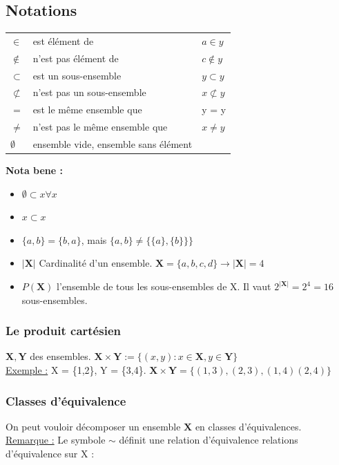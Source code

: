 \documentclass[12pt,a4paper]{article}
\begin{document}
\subsection{Notations}
\begin{center}
\begin{tabular}{lll}
$\in $&  est élément de & $a \in y$\\
$\not \in $& n'est pas élément de &$ c \notin y$\\
$\subset $ &  est un sous-ensemble & $y \subset y$\\
$\not \subset$ & n'est pas un sous-ensemble & $x \not\subset y$\\
$=$ & est le même ensemble que & y = y\\
$\neq$ &  n'est pas le même ensemble que & $x \neq y$\\
$\emptyset$ & ensemble vide, ensemble sans élément\\
\end{tabular}
\end{center}
\textbf{Nota bene :}
\begin{itemize}[label=\textbullet,itemsep=-10pt]
\item $\emptyset \subset x \forall x$
\item $x \subset x$
\item $\{a,b\} = \{b,a\}$, mais $\{a,b\} \neq \{\{a\},\{b\}\}\}$
\item $| \mathbf{X}|$ Cardinalité d'un ensemble. $\mathbf{X} = \{a, b, c, d\} \to |\mathbf{X}| = 4$
\item $P(\mathbf{X})$ l'ensemble de tous les sous-ensembles de X. Il vaut $2^{|\mathbf{X}|} = 2^4 = 16$ sous-ensembles.
\end{itemize}

\subsubsection{Le produit cartésien}
$\mathbf{X}, \mathbf{Y}$ des ensembles. $\mathbf{X} \times \mathbf{Y} := \{(x,y) : x \in \mathbf{X}, y \in \mathbf{Y}\}$
\\\underline{Exemple :} X = \{1,2\}, Y = \{3,4\}. $\mathbf{X} \times \mathbf{Y} = \{(1,3), (2,3), (1,4) (2,4)\}$

\subsubsection{Classes d'équivalence}
On peut vouloir décomposer un ensemble $\mathbf{X}$ en classes d'équivalences.
\\\underline{Remarque :} Le symbole $\sim$ définit une relation d'équivalence relations d'équivalence sur X : 
\end{document}
